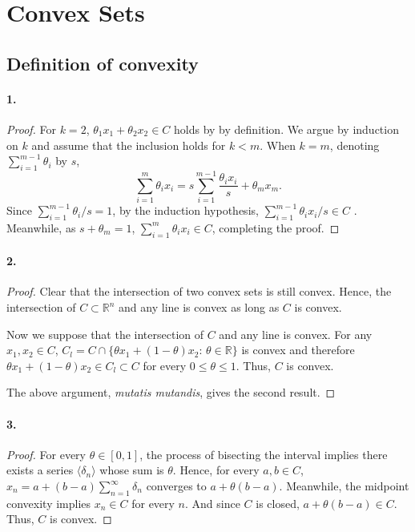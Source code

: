 \section{Convex Sets}

\subsection{Definition of convexity}
  \paragraph{1.}
  \begin{proof}
    For $k=2$, $\theta_1x_1+\theta_2x_2\in C$ holds by by definition. We argue
    by induction on $k$ and assume that the inclusion holds for $k<m$. When $k=
    m$, denoting $\sum_{i=1}^{m-1}\theta_i$ by $s$,
    \[
      \sum_{i=1}^m \theta_ix_i = 
      s\sum_{i=1}^{m-1}\frac{\theta_ix_i}{s} + \theta_mx_m.
    \]
    Since $\sum_{i=1}^{m-1}\theta_i/s=1$, by the induction hypothesis,
    $\sum_{i=1}^{m-1}\theta_ix_i/s\in C$ . Meanwhile, as $s+\theta_m=1$, 
    $\sum_{i=1}^m\theta_ix_i\in C$, completing the proof.
  \end{proof}

  \paragraph{2.}
  \begin{proof}
    Clear that the intersection of two convex sets is still convex. Hence, the 
    intersection of $C\subset\mathbb{R}^n$ and any line is convex as long as $C$
    is convex.\par
    Now we suppose that the intersection of $C$ and any line is convex. For any 
    $x_1,x_2\in C$, $C_l=C\cap\{\theta x_1+(1-\theta)x_2:\,\theta\in\mathbb{R}
    \}$ is convex and therefore $\theta x_1+(1-\theta)x_2\in C_l\subset C$ for
    every $0\le\theta\le 1$. Thus, $C$ is convex.\par
    The above argument, \textit{mutatis mutandis}, gives the second result.
  \end{proof}

  \paragraph{3.}
  \begin{proof}
    For every $\theta\in[0,1]$, the process of bisecting the interval implies 
    there exists a series $\langle\delta_n\rangle$ whose sum is $\theta$. Hence,
    for every $a,b\in C$, $x_n = a+(b-a)\sum_{n=1}^\infty\delta_n$ converges to
    $a+\theta(b-a)$. Meanwhile, the midpoint convexity implies $x_n\in C$ for 
    every $n$. And since $C$ is closed, $a+\theta(b-a)\in C$. Thus, $C$ is 
    convex.
  \end{proof}

